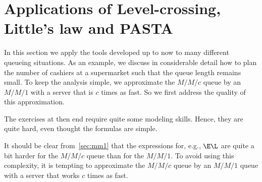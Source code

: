 


\section{Applications of Level-crossing, Little's law and PASTA}
\label{sec:mnmn1}

In this section we apply the tools developed up to now to many different queueing situations.
As an example, we discuss in considerable detail how to plan the number of cashiers at a supermarket such that the queue length remains small.
To keep the analysis simple, we approximate the $M/M/c$ queue by an $M/M/1$ with a server that is $c$ times as fast. So we first address the quality of this approximation.

The exercises at then end require quite some  modeling skills.
Hence, they are quite hard, even thought the formulas are simple.


It should be clear from~\cref{sec:mm1} that the expressions for, e.g., $\E\L$ are quite a bit harder for the $M/M/c$ queue than for the $M/M/1$.
To avoid using this complexity, it is tempting to approximate the $M/M/c$ queue by an $M/M/1$ queue with a server that works $c$ times as fast.

